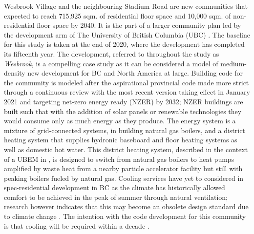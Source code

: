 \documentclass[twocolumn, a4paper,10pt]{article}
\begin{document}
Wesbrook Village and the neighbouring Stadium Road are new communities that expected to reach 715,925 sqm. of residential floor space and 10,000 sqm. of non-residential floor space by 2040. It is the part of a larger community plan led by the development arm of The University of British Columbia (UBC) \citep{ubc_planning_ubc_2020_SR, ubc_planning_ubc_2020_wb}. The baseline for this study is taken at the end of 2020, where the development has completed its fifteenth year. The development, referred to throughout the study as \textit{Wesbrook}, is a compelling case study as it can be considered a model of medium-density new development for BC and North America at large. Building code for the community is modeled after the aspirational provincial code made more strict through a continuous review with the most recent version taking effect in January 2021 and targeting net-zero energy ready (NZER) by 2032; NZER buildings are built such that with the addition of solar panels or renewable technologies they would consume only as much energy as they produce. The energy system is a mixture of grid-connected systems, in building natural gas boilers, and a district heating system that supplies hydronic baseboard and floor heating systems as well as domestic hot water. This district heating system, described in the context of a UBEM in \citet{mccarty_accepted_2020}, is designed to switch from natural gas boilers to heat pumps amplified by waste heat from a nearby particle accelerator facility but still with peaking boilers fueled by natural gas. Cooling services have yet to considered in spec-residential development in BC as the climate has historically allowed comfort to be achieved in the peak of summer through natural ventilation; research however indicates that this may become an obsolete design standard due to climate change \citep{rysanek_forecasting_2021}. The intention with the code development for this community is that cooling will be required within a decade \citep{noauthor_residential_2021}.
\end{document}
